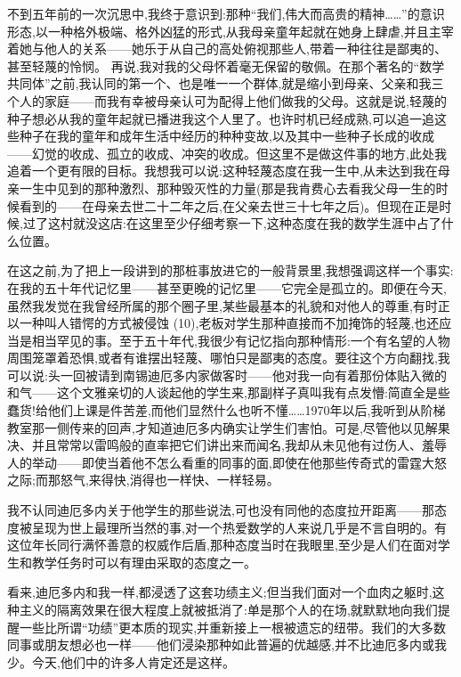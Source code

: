 不到五年前的一次沉思中,我终于意识到:那种“我们,伟大而高贵的精神……”的意识形态,以一种格外极端、格外凶猛的形式,从我母亲童年起就在她身上肆虐,并且主宰着她与他人的关系——她乐于从自己的高处俯视那些人,带着一种往往是鄙夷的、甚至轻蔑的怜悯。
 再说,我对我的父母怀着毫无保留的敬佩。在那个著名的“数学共同体”之前,我认同的第一个、也是唯一一个群体,就是缩小到母亲、父亲和我三个人的家庭——而我有幸被母亲认可为配得上他们做我的父母。这就是说,轻蔑的种子想必从我的童年起就已播进我这个人里了。也许时机已经成熟,可以追一追这些种子在我的童年和成年生活中经历的种种变故,以及其中一些种子长成的收成——幻觉的收成、孤立的收成、冲突的收成。但这里不是做这件事的地方,此处我追着一个更有限的目标。我想我可以说:这种轻蔑态度在我一生中,从未达到我在母亲一生中见到的那种激烈、那种毁灭性的力量(那是我肯费心去看我父母一生的时候看到的——在母亲去世二十二年之后,在父亲去世三十七年之后)。但现在正是时候,过了这村就没这店:在这里至少仔细考察一下,这种态度在我的数学生涯中占了什么位置。

在这之前,为了把上一段讲到的那桩事放进它的一般背景里,我想强调这样一个事实:在我的五十年代记忆里——甚至更晚的记忆里——它完全是孤立的。即便在今天,虽然我发觉在我曾经所属的那个圈子里,某些最基本的礼貌和对他人的尊重,有时正以一种叫人错愕的方式被侵蚀 (10),老板对学生那种直接而不加掩饰的轻蔑,也还应当是相当罕见的事。至于五十年代,我很少有记忆指向那种情形:一个有名望的人物周围笼罩着恐惧,或者有谁摆出轻蔑、哪怕只是鄙夷的态度。要往这个方向翻找,我可以说:头一回被请到南锡迪厄多内家做客时——他对我一向有着那份体贴入微的和气——这个文雅亲切的人谈起他的学生来,那副样子真叫我有点发懵:简直全是些蠢货!给他们上课是件苦差,而他们显然什么也听不懂……1970年以后,我听到从阶梯教室那一侧传来的回声,才知道迪厄多内确实让学生们害怕。可是,尽管他以见解果决、并且常常以雷鸣般的直率把它们讲出来而闻名,我却从未见他有过伤人、羞辱人的举动——即使当着他不怎么看重的同事的面,即使在他那些传奇式的雷霆大怒之际;而那怒气,来得快,消得也一样快、一样轻易。

我不认同迪厄多内关于他学生的那些说法,可也没有同他的态度拉开距离——那态度被呈现为世上最理所当然的事,对一个热爱数学的人来说几乎是不言自明的。有这位年长同行满怀善意的权威作后盾,那种态度当时在我眼里,至少是人们在面对学生和教学任务时可以有理由采取的态度之一。

看来,迪厄多内和我一样,都浸透了这套功绩主义;但当我们面对一个血肉之躯时,这种主义的隔离效果在很大程度上就被抵消了:单是那个人的在场,就默默地向我们提醒一些比所谓“功绩”更本质的现实,并重新接上一根被遗忘的纽带。我们的大多数同事或朋友想必也一样——他们浸染那种如此普遍的优越感,并不比迪厄多内或我少。今天,他们中的许多人肯定还是这样。

